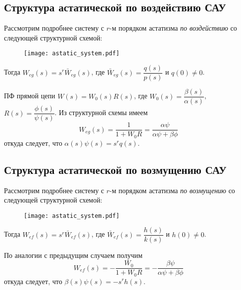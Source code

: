 \documentclass[../../TAU.tex]{subfiles}
\begin{document}
\subsection{Структура астатической по воздействию САУ }

    Рассмотрим подробнее систему с $r$-м порядком астатизма {\it по воздействию} со следующей структурной схемой:
    \begin{figure}[h]
        \centering
        \texttt{[image: astatic\_system.pdf]}
    \end{figure}

    Тогда $W_{eg}(s) = s^r\bar W_{eg}(s)$, где $\bar W_{eg}(s) = \dfrac{q(s)}{p(s)}$ и $q(0)\neq 0$.

    ПФ прямой цепи $W(s) = W_0(s)R(s)$, где $W_0(s) = \dfrac{\beta(s)}{\alpha(s)}$, $R(s) = \dfrac{\phi(s)}{\psi(s)}$. Из структурной схемы имеем
    $$
        W_{eg}(s) = \frac{1}{1+W_0R} = \frac{\alpha\psi}{\alpha\psi+\beta\phi}
    $$
    откуда следует, что $\alpha(s)\psi(s) = s^r q(s)$.

\subsection{Структура астатической по возмущению САУ }

    Рассмотрим подробнее систему с $r$-м порядком астатизма {\it по возмущению} со следующей структурной схемой:
    \begin{figure}[h]
        \centering
        \texttt{[image: astatic\_system.pdf]}
    \end{figure}

    Тогда $W_{ef}(s) = s^r\bar W_{ef}(s)$, где $\bar W_{ef}(s) = \dfrac{h(s)}{k(s)}$ и $h(0)\neq 0$.

    По аналогии с предыдущим случаем получим
    $$
        W_{ef}(s) = -\frac{W_0}{1+W_0R} = -\frac{\beta\psi}{\alpha\psi+\beta\phi}
    $$
    откуда следует, что $\beta(s)\psi(s) = -s^r h(s)$.

\end{document}
